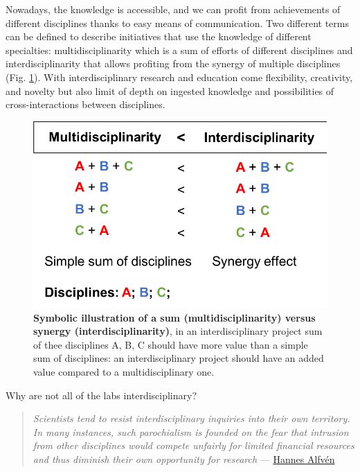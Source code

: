 \documentclass[12pt,]{book}
\theoremstyle{definition}
\theoremstyle{definition}
\theoremstyle{definition}
\theoremstyle{remark}
\begin{document}
Nowadays, the knowledge is accessible, and we can profit from
achievements of different disciplines thanks to easy means of
communication. Two different terms can be defined to describe
initiatives that use the knowledge of different specialties:
multidisciplinarity which is a sum of efforts of different disciplines
and interdisciplinarity that allows profiting from the synergy of
multiple disciplines (Fig. \ref{fig:multidisc}). With interdisciplinary
research and education come flexibility, creativity, and novelty but
also limit of depth on ingested knowledge and possibilities of
cross-interactions between disciplines.

\begin{figure}

{\centering \includegraphics[width=0.6\linewidth]{figures-ext/multidisc} 

}

\caption[Symbolic illustration of a sum (multidisciplinarity) versus synergy (interdisciplinarity)]{\textbf{Symbolic illustration of a sum
(multidisciplinarity) versus synergy (interdisciplinarity)}, in an
interdisciplinary project sum of thee disciplines A, B, C should have
more value than a simple sum of disciplines: an interdisciplinary
project should have an added value compared to a multidisciplinary one.}\label{fig:multidisc}
\end{figure}







Why are not all of the labs interdisciplinary?

\begin{quote}
\emph{Scientists tend to resist interdisciplinary inquiries into their
own territory. In many instances, such parochialism is founded on the
fear that intrusion from other disciplines would compete unfairly for
limited financial resources and thus diminish their own opportunity for
research} ---
\href{http://www.azquotes.com/author/28130-Hannes_Alfven}{Hannes Alfvén}
\end{quote}
\end{document}
